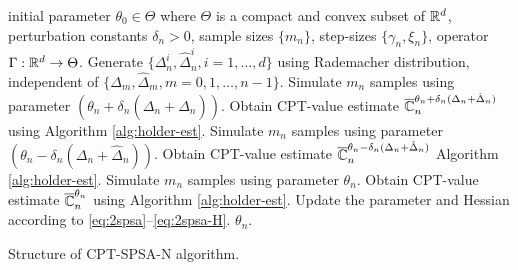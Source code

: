 \documentclass{article}
\numberwithin{equation}{section}
\numberwithin{theorem}{section}
\begin{document}
\begin{algorithm}[t]
\begin{algorithmic}
initial parameter $\theta_0 \in \Theta$ where $\Theta$ is a compact and convex subset of $\mathbb{R}^d$, perturbation constants $\delta_n>0$, sample sizes $\{m_n\}$, step-sizes $\{\gamma_n, \xi_n\}$, operator $\Gamma: \mathbb{R}^d \rightarrow \Theta$.
	\State Generate $\{\Delta_n^{i}, \widehat\Delta_n^{i}, i=1,\ldots,d\}$ using Rademacher distribution, independent of $\{\Delta_m, \widehat \Delta_m, m=0,1,\ldots,n-1\}$.
	\PEval
	    \State Simulate $m_n$ samples  using parameter $(\theta_n+\delta_n (\Delta_n + \hat \Delta_n))$.
	    \State Obtain CPT-value estimate $\overline {\mathbb{C}}_n^{\theta_n+\delta_n (\Delta_n+\hat \Delta_n)}$ using Algorithm \ref{alg:holder-est}.
	    \EndPEval
	    \PEvalPrime
  	    \State Simulate $m_n$ samples using parameter $(\theta_n-\delta_n (\Delta_n + \hat \Delta_n))$.
	    \State Obtain CPT-value estimate $\overline {\mathbb{C}}_n^{\theta_n-\delta_n (\Delta_n+\hat\Delta_n)}$ Algorithm \ref{alg:holder-est}.
	    \EndPEvalPrime
	    	    \PEvalPrimeDouble
  	    \State Simulate $m_n$ samples using parameter $\theta_n$.
	    \State Obtain CPT-value estimate $\overline {\mathbb{C}}_n^{\theta_n}$ using Algorithm \ref{alg:holder-est}.
	    \EndPEvalPrimeDouble
	    \PImpNewton
		\State Update the parameter and Hessian according to \eqref{eq:2spsa}--\eqref{eq:2spsa-H}.
		\EndPImpNewton
\EndFor
{} $\theta_n.$
\end{algorithmic}
\caption{Structure of CPT-SPSA-N algorithm.}
\label{alg:structure-2}
\end{algorithm}
\end{document}

